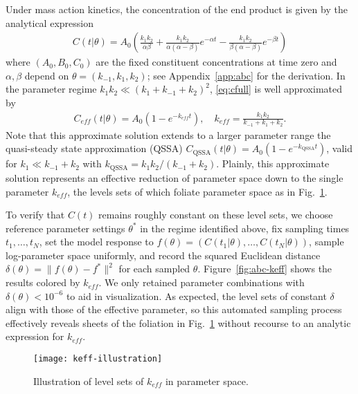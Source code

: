 Under mass action kinetics, the concentration of the end product is
given by the analytical expression
% 
\begin{align}
  C(t|\theta)
  =
  A_0
  \left(
  \frac{k_1 k_2}{\alpha \beta}
  +
  \frac{k_1 k_2}{\alpha(\alpha - \beta)}
  e^{-\alpha t}
  -
  \frac{k_1 k_2}{\beta(\alpha - \beta)}
  e^{-\beta t}
  \right)
  \label{eq:cfull}
\end{align}
% 
where $(A_0,B_0,C_0)$ are the fixed constituent concentrations at time
zero and $\alpha,\beta$ depend on $\theta=(k_{-1},k_1,k_2)$; see
Appendix~\ref{app:abc} for the derivation. In the parameter regime
$k_1 k_2 \ll (k_1 + k_{-1} + k_2)^2$, \eqref{eq:cfull} is well
approximated by
% 
\begin{align}
  C_{eff}(t|\theta)
  =
  A_0
  \left(
  1 - e^{-k_{eff} t}
  \right) ,
  \quad
  k_{eff}
  =
  \frac{k_1 k_2}{k_{-1} + k_1 + k_2} .
  \label{ABC-QSSA}
\end{align}
% 
Note that this approximate solution extends to a larger parameter
range the quasi-steady state approximation (QSSA)
$C_\mathrm{QSSA}(t|\theta) = A_0 (1 - e^{-k_\mathrm{QSSA} t})$,
valid for $k_1 \ll k_{-1} + k_2$ with
$k_\mathrm{QSSA}=k_1 k_2/(k_{-1} + k_2)$.  Plainly, this approximate
solution represents an effective reduction of parameter space down to
the single parameter $k_{eff}$, the levels sets of which
foliate parameter space as in Fig.~\ref{fig:abc-ill}.

To verify that $C(t)$ remains roughly constant on these level sets, we
choose reference parameter settings $\theta^*$ in the regime
identified above, fix sampling times $t_1,\ldots,t_N$, set the model
response to $f(\theta)=( C(t_1|\theta) , \ldots , C(t_N|\theta) )$,
sample log-parameter space uniformly, and record the squared Euclidean
distance $\delta(\theta) = \| f(\theta) - f^* \|^2$ for each sampled
$\theta$.  Figure~\ref{fig:abc-keff} shows the results colored by
$k_{eff}$. We only retained parameter combinations with
$\delta(\theta) < 10^{-6}$ to aid in visualization. As expected, the
level sets of constant $\delta$ align with those of the effective
parameter, so this automated sampling process effectively reveals
sheets of the foliation in Fig.~\ref{fig:abc-ill} without recourse to
an analytic expression for $k_{eff}$.

\begin{figure}[!htp]
\centering
  \texttt{[image: keff-illustration]}
\caption[Illustration of level sets of the effective parameter in a
  model of chemical kinetics]{Illustration of level sets of $k_{eff}$ in parameter space. \label{fig:abc-ill}} 
\end{figure}


